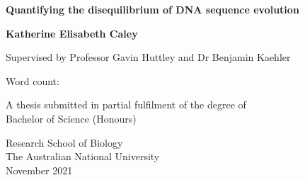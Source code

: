 \begin{titlepage}
   \begin{center}
   
    \vspace*{1cm}
    \LARGE
    
    \textbf{Quantifying the disequilibrium of DNA sequence evolution}
    
    
    \vspace{2cm}
    
    \large

    \textbf{Katherine Elisabeth Caley}
    
    Supervised by Professor Gavin Huttley and Dr Benjamin Kaehler
    
    \vfill
    
    \normalsize
    
    Word count: \\

   \vspace{1.5cm}

    A thesis submitted in partial fulfilment of the degree of \\
    Bachelor of Science (Honours)   
    
    \vspace{2cm}
    
    Research School of Biology\\
    
    The Australian National University\\
    
    November 2021
    
    \vspace{0.8cm}
    
    
   \end{center}
\end{titlepage}